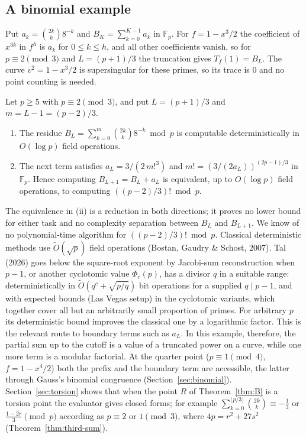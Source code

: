 \documentclass[11pt,a4paper]{article}
\numberwithin{equation}{section}
\theoremstyle{plain}
\newcommand{\letteredname}{}
\newenvironment{lettered}[2]{\renewcommand{\letteredname}{#1}\renewcommand{\theinnerlettered}{#2}\innerlettered}{\endinnerlettered}
\theoremstyle{definition}
\newcommand{\F}{\mathbb{F}}
\begin{document}
\subsection{A binomial example}
Put $a_k=\binom{2k}{k}8^{-k}$ and $B_K=\sum_{k=0}^{K-1}a_k$ in $\F_p$. For $f=1-x^3/2$ the coefficient of $x^{3k}$ in $f^h$ is $a_k$ for $0\le k\le h$, and all other coefficients vanish, so for $p\equiv2\pmod 3$ and $L=(p+1)/3$ the truncation gives $T_f(1)=B_L$. The curve $v^2=1-x^3/2$ is supersingular for these primes, so its trace is $0$ and no point counting is needed.

\begin{lettered}{Corollary}{E}[A partial sum and its next term]\label{cor:E}
Let $p\ge5$ with $p\equiv2\pmod3$, and put $L=(p+1)/3$ and $m=L-1=(p-2)/3$.
\begin{enumerate}[label=\textup{(\roman*)},nosep]
\item The residue $B_L=\sum_{k=0}^{m}\binom{2k}{k}8^{-k}\bmod p$ is computable deterministically in $O(\log p)$ field operations.
\item The next term satisfies $a_L=3/(2\,m!^3)$ and $m!=(3/(2a_L))^{(2p-1)/3}$ in $\F_p$. Hence computing $B_{L+1}=B_L+a_L$ is equivalent, up to $O(\log p)$ field operations, to computing $((p-2)/3)!\bmod p$.
\end{enumerate}
\end{lettered}

The equivalence in (ii) is a reduction in both directions; it proves no lower bound for either task and no complexity separation between $B_L$ and $B_{L+1}$. We know of no polynomial-time algorithm for $((p-2)/3)!\bmod p$. Classical deterministic methods use $\widetilde O(\sqrt p)$ field operations (Bostan, Gaudry \& Schost, 2007). Tal (2026) goes below the square-root exponent by Jacobi-sum reconstruction when $p-1$, or another cyclotomic value $\Phi_r(p)$, has a divisor $q$ in a suitable range: deterministically in $\widetilde O(q^c+\sqrt{p/q})$ bit operations for a supplied $q\mid p-1$, and with expected bounds (Las Vegas setup) in the cyclotomic variants, which together cover all but an arbitrarily small proportion of primes. For arbitrary $p$ its deterministic bound improves the classical one by a logarithmic factor. This is the relevant route to boundary terms such as $a_L$. In this example, therefore, the partial sum up to the cutoff is a value of a truncated power on a curve, while one more term is a modular factorial. At the quarter point ($p\equiv1\pmod4$, $f=1-x^4/2$) both the prefix and the boundary term are accessible, the latter through Gauss's binomial congruence (Section~\ref{sec:binomial}). Section~\ref{sec:torsion} shows that when the point $R$ of Theorem~\ref{thm:B} is a torsion point the evaluator gives closed forms; for example $\sum_{k=0}^{\lfloor p/3\rfloor}\binom{2k}{k}\equiv-\tfrac13$ or $\tfrac{1-2r}{3}\pmod p$ according as $p\equiv2$ or $1\pmod 3$, where $4p=r^2+27s^2$ (Theorem~\ref{thm:third-sum}).
\end{document}
